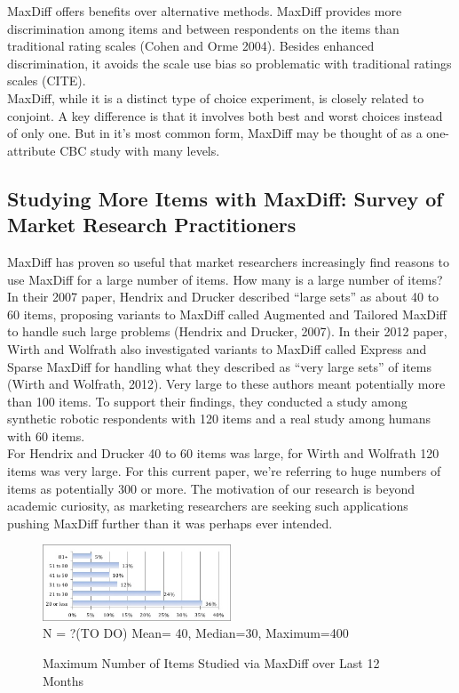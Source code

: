 \documentclass[mksc,blindrev]{informs3} %
\begin{document}
MaxDiff offers benefits over alternative methods. MaxDiff provides more discrimination among items and between respondents on the items than traditional rating scales (Cohen and Orme 2004). Besides enhanced discrimination, it avoids the scale use bias so problematic with traditional ratings scales (CITE).\\
MaxDiff, while it is a distinct type of choice experiment, is closely related to conjoint. A key difference is that it involves both best and worst choices instead of only one. But in it’s most common form, MaxDiff may be thought of as a one-attribute CBC study with many levels.  \\
\subsection{Studying More Items with MaxDiff: Survey of Market Research Practitioners}
MaxDiff has proven so useful that market researchers increasingly find reasons to use MaxDiff for a large number of items.  How many is a large number of items?  In their 2007 paper, Hendrix and Drucker described “large sets” as about 40 to 60 items, proposing variants to MaxDiff called Augmented and Tailored MaxDiff to handle such large problems (Hendrix and Drucker, 2007). In their 2012 paper, Wirth and Wolfrath also investigated variants to MaxDiff called Express and Sparse MaxDiff for handling what they described as “very large sets” of items (Wirth and Wolfrath, 2012).  Very large to these authors meant potentially more than 100 items.  To support their findings, they conducted a study among synthetic robotic respondents with 120 items and a real study among humans with 60 items.\\
For Hendrix and Drucker 40 to 60 items was large, for Wirth and Wolfrath 120 items was very large.  For this current paper, we’re referring to huge numbers of items as potentially 300 or more. The motivation of our research is beyond academic curiosity, as marketing researchers are seeking such applications pushing MaxDiff further than it was perhaps ever intended. \\
\begin{figure}[!ht]
\caption{Maximum Number of Items Studied via MaxDiff over Last 12 Months}
\includegraphics[width=0.5\textwidth]{plots/maxnumstudy}\\
N = ?(TO DO) Mean= 40, Median=30, Maximum=400
\label{fig:max}
\end{figure}
\end{document}
